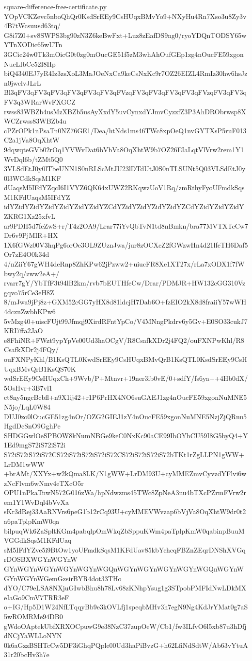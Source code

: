 \documentclass[11pt]{article}
\theoremstyle{definition}
\theoremstyle{remark}
\begin{document}
\begin{filecontents*}[overwrite]{square-difference-free-certificate.py}
YOpVCKZevc5nboQhQr0KsdSrEEy9CsHUqxBMvYo9+NXyHu4Rn7Xso3u8Zy3v4B7tWcsuusd63tq/
G8i7Z0+sv8SWPS3bg90zN3Z6keBwFxt+Luz8zEafDS9ng0/ryoYDQnTODSY65wYTnXODic65wUTn
3GCic24w0Tk3mOicG0t0zg0mOucGE51f5zM3whAhOufGEp1zg4nOucFE59xgonNucLIbCc52I8Hp
biQ4340EJ7yR4Iz3zsXoL3MaJOeNxCa9keCsNxKc9r7OZ26EIZL4RmIz30hw6hsJzn0jwclvJLrL
Bl3qFV3qFV3qFV3qFV3qFV3qFV3qFVzqFV3qFV3qFV3qFV3qFVzqFV3qFV3qFV3q3WRarWvFXGCZ
rwss83WBZb4usMzXBZb5usAyXxdY5uvCynxdYJmvCyzzfZ3P3AhDRObrwsp8XWCZrwss83WBZb4u
cPZrOPk1nPsaTn0NZ76GE1/Dea/htNds1ms46TWc8xpOeQ1nvGYTXsP5ruF013C2a1jVa8OqXhtW
9dqwqteGVb02rOq1YVWvDat6bVbVa8OqXhtW9b7OZ26EIaLqtVlVrw2rem1Y1WvDql6b/tZMt5Q0
3VLSdEtJ0y0lTbeUNN1S0nRLScMtJU23lDTdUtJ0S0nTLSUNt5Q03VLSdEtJ0y0l3WCdkSqsM1KF
dUaqsM5IFdYZqcI6I1VYZ6QK64xUWZ2RKqwzUoV1Rq/zmRthyFyoUFmdkSqsM1KFdUaqsM5IFdYZ
idYZidYZidYZidYZidYZidYZidYZCdYZidYZidYZidYZidYZCdYZidYZidYZidYZKRG1Xz25xfvL
ar9PDH5d7feZwS+r/T4z2OA9/Lrar77iYvQbTvN1td8nBmkn/bra77MVTXTcCw7Dr6v9PjMIR+HX
1X6fGWz00V3hqPg6orOe3OL9ZUznJwa/jur8zOCXcZ2fGWzwHn4d21lfcTH6Daf5Or7zE4O0k34d
4/nZiiY67gWH4deRnp8ZhKPw62jPzww2+uiucFR8Xe1XT27x/rLa7xODX1f7fWbwy2q/zww2eA+/
rvarr7gY/YbTfF3t94lB2km/rvb7bEUTHfeCw/Drar/PDMJR+HW132cGG310Vzgqvo75rCe3eH8Z
8/mJwa9jPj8z+GXM52cGG7yHX8d81ldcjH7Dab6O+fzEIO2kX8d8fraiiY57wWH4dcznZwbhKPw6
5vMzg40+uiscFUjt99Jfmqj9XirdRFntYpCo/V4MNngPkdrv6y5Gv+E0SO33cukJ7KRI7ffa2JaO
e8FhiNR+FWzt9ypYpVe00Ud3haOCgV/R8CsafkXDr2j4FQ2/ouFXNPwKhl/R8CsafkXDr2j4FQy/
ouFXNPyKhl/B1KsQTL0KwdSrEEy9CsHUqxBMvQrB1KsQTL0KsdSrEEy9CsHUqxBMvQrB1KsQS70K
wdSrEEy9CsHUqxCh+9Wvb/P+Mtnvr+19ner3ib0vE/0+sdfY/fs6ya++4Hb0dX/5OsHvr+3B7vl1
ct8ny5ngcBcbfl+n9X1ij42+r1P6PrHX4NO6suGAEJ1zg4nOucFE59xgonNuMNE5N5jo/LqL0W84
DUJ0zo0lOucGE51zg4nOr/OZG2GIEJ1zY4nOucFE59xgonNuMNE5NzjZjQRnu5HgdDcSnO9GghPe
SHDGGwlOeSPBOW8kNumNBGe9keC0NxKc90aCE99IbOYbCU59I8G5byQ4+Y1Ed9mgS72iS72iS72i
S72iS72iS72iS72CS72iS72iS72iS72iS72CS72iS72iS72iS72bTKt1rZgLLPN1gWW+LrDM1wWW
+brAMt/XXYx+w2kQma8LK/N1gWW+LrDM93U+cyMMEZmvCyvzdYFlvi6wzNcFlvm6wNmv4eTXcO5r
OPU1nPkaTnwN572G016zWa/hpNdwzms45TWc8ZpNeA3nu4bTXcPZrmFVrw2rem1Y1WvDql4bVvXa
sKr3dRej33AaRNVrs6peG1b12rCq93U+cyMMEVWvzap6bVjVa8OqXhtW9dr0t2a6paTplpKmW0qa
bilpuqWk6ZaSpltKGm4pabqlpOmWkqZbSppuKWm4paTplpKmW0qabinpBuuMVGGdkSqsM1KFdUaq
sM5IFdYZve5i9BtOw1yoUFmdkSqsM1KFdUav85kbYchcqFBZnZEqrDNShXVGqrDOSBXWGYnWGYnW
GYnWGYnWGYnWGYnWGYnWGQnWGYnWGYnWGYnWGYnWGQnWGYnWGYnWGYnWGemGzsirBYR4dot33THo
dYO/C79eLSA8NXjuGIwbBhu8h78Lv68zKNhpYsug1g3STpobPMFIdNwLDkMXeIaGo9CmV7TRR3eF
o+IG/Hp5D1W24NfLTqqyBb9e3kOVLfj1speqbMHv3h7egN9Ng4KdJrYMat0g7aS5wROMRMe94DB0
gWdoOAptekUbfXRXOCpuwG9e38NzC37zupOeW/Cb1/fw3ILfvO6l5xb87u3hDfjdNCjYaWLLoNYN
0k6aGzzBSHTcCw5DF3iGhqPQple00Ud3haPiBvzG+h62LfiNdSdtW/Ab63vYtuA31r20bcHv3h7e

\end{filecontents*}
\end{document}
